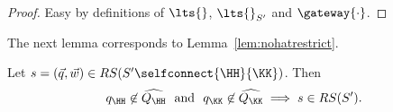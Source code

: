 
\begin{proof}
Easy by definitions of $\lts{}$, $\lts{}_{S'}$  and 
$\gateway{\cdot}$.
\end{proof}
 
The next lemma corresponds to Lemma~\ref{lem:nohatrestrict}.
 
 \begin{lemma}
\label{lem:nohatrestrictself}
Let $s= (\vec{q},\vec{w}) \in RS(S'\selfconnect{\HH}{\KK})$. Then
$${q}_\HH\not\in\widehat{Q_\HH}\ \text{ and }\  {q}_\KK\not\in\widehat{Q_\KK} \implies 
s\in RS(S').$$
\end{lemma}


